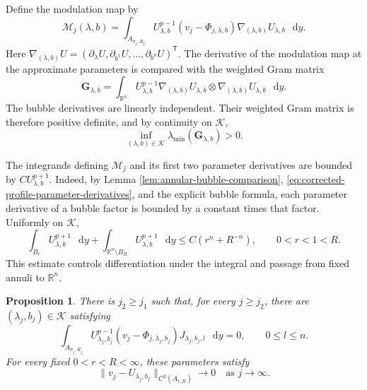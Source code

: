 \documentclass[11pt]{article}
\numberwithin{equation}{section}
\newtheorem{proposition}[theorem]{Proposition}
\theoremstyle{remark}
\newcommand{\R}{\mathbb R}
\newcommand{\norm}[1]{\lVert #1\rVert}
\newcommand{\dd}{\mathop{}\!\mathrm{d}}
\begin{document}
Define the modulation map by
\begin{equation}\label{eq:modulation-map}
 \mathcal M_j(\lambda,b)
 =\int_{A_{\sigma_j,R_j}}
 U_{\lambda,b}^{p-1}(v_j-\Phi_{j,\lambda,b})
 \nabla_{(\lambda,b)}U_{\lambda,b}\,\dd y.
\end{equation}
Here
\(\nabla_{(\lambda,b)}U=(\partial_\lambda U,\partial_{b^1}U,\ldots,
\partial_{b^n}U)^{\mathsf T}\).
The derivative of the modulation map at the approximate parameters is
compared with the weighted Gram matrix
\[
 \mathbf G_{\lambda,b}
 =\int_{\R^n}U_{\lambda,b}^{p-1}
 \nabla_{(\lambda,b)}U_{\lambda,b}
 \otimes\nabla_{(\lambda,b)}U_{\lambda,b}\,\dd y.
\]
The bubble derivatives are linearly independent. Their weighted Gram
matrix is therefore positive definite, and {by continuity on
\(\mathcal K\),}
\begin{equation}\label{eq:modulation-gram-positivity}
 \inf_{(\lambda,b)\in\mathcal K}
 \lambda_{\min}(\mathbf G_{\lambda,b})>0.
\end{equation}

The integrands defining \(\mathcal M_j\) and its first two parameter
derivatives are bounded by \(CU_{\lambda,b}^{p+1}\). {Indeed, by
Lemma  \ref{lem:annular-bubble-comparison},
\eqref{eq:corrected-profile-parameter-derivatives}, and the explicit bubble
formula, each parameter derivative of a bubble factor is bounded by a
constant times that factor.} Uniformly on \(\mathcal K\),
\begin{equation}\label{eq:modulation-tail-bound}
 \int_{B_r}U_{\lambda,b}^{p+1}\,\dd y+
 \int_{\R^n\setminus B_R}U_{\lambda,b}^{p+1}\,\dd y
 \le C(r^n+R^{-n}),\qquad 0<r<1<R.
\end{equation}
This estimate controls differentiation under the integral and passage
from fixed annuli to \(\R^n\).

\begin{proposition}\label{prop:final-modulation}
There is \(j_2\ge j_1\) such that, for every \(j\ge j_2\), there are
\((\lambda_j,b_j)\in\mathcal K\) satisfying
\begin{equation}\label{eq:final-orthogonality}
 \int_{A_{\sigma_j,R_j}}U_{\lambda_j,b_j}^{p-1}
 (v_j-\Phi_{j,\lambda_j,b_j})J_{\lambda_j,b_j,l}\,\dd y=0,
 \qquad 0\le l\le n.
\end{equation}
For every fixed \(0<r<R<\infty\), these parameters satisfy
\begin{equation}\label{eq:final-parameter-approximation}
 \norm{v_j-U_{\lambda_j,b_j}}_{C^2(\overline{A_{r,R}})}
 \to0
 \quad\text{as }j\to\infty.
\end{equation}
\end{proposition}
\end{document}
